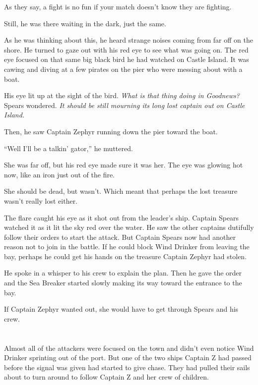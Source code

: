 \documentclass[12pt]{extbook}
\begin{document}
  As they say, a fight is no fun if your match doesn't know they are
  fighting.
  
  Still, he was there waiting in the dark, just the same.
  
  As he was thinking about this, he heard strange noises coming from far
  off on the shore. He turned to gaze out with his red eye to see what was
  going on. The red eye focused on that same big black bird he had watched
  on Castle Island. It was cawing and diving at a few pirates on the pier
  who were messing about with a boat.
  
  His eye lit up at the sight of the bird. \emph{What is that thing doing
  in Goodnews?} Spears wondered. \emph{It should be still mourning its
  long lost captain out on Castle Island.}
  
  Then, he saw Captain Zephyr running down the pier toward the boat.
  
  \enquote{Well I'll be a talkin' gator,} he muttered.
  
  She was far off, but his red eye made sure it was her. The eye was
  glowing hot now, like an iron just out of the fire.
  
  She should be dead, but wasn't. Which meant that perhaps the lost
  treasure wasn't really lost either.
  
  The flare caught his eye as it shot out from the leader's ship. Captain
  Spears watched it as it lit the sky red over the water. He saw the other
  captains dutifully follow their orders to start the attack. But Captain
  Spears now had another reason not to join in the battle. If he could
  block Wind Drinker from leaving the bay, perhaps he could get his hands
  on the treasure Captain Zephyr had stolen.
  
  He spoke in a whisper to his crew to explain the plan. Then he gave the
  order and the Sea Breaker started slowly making its way toward the
  entrance to the bay.
  
  If Captain Zephyr wanted out, she would have to get through Spears and
  his crew.
  
  \section{}\label{section-36}
  
  Almost all of the attackers were focused on the town and didn't even
  notice Wind Drinker sprinting out of the port. But one of the two ships
  Captain Z had passed before the signal was given had started to give
  chase. They had pulled their sails about to turn around to follow
  Captain Z and her crew of children.
  
\end{document}
